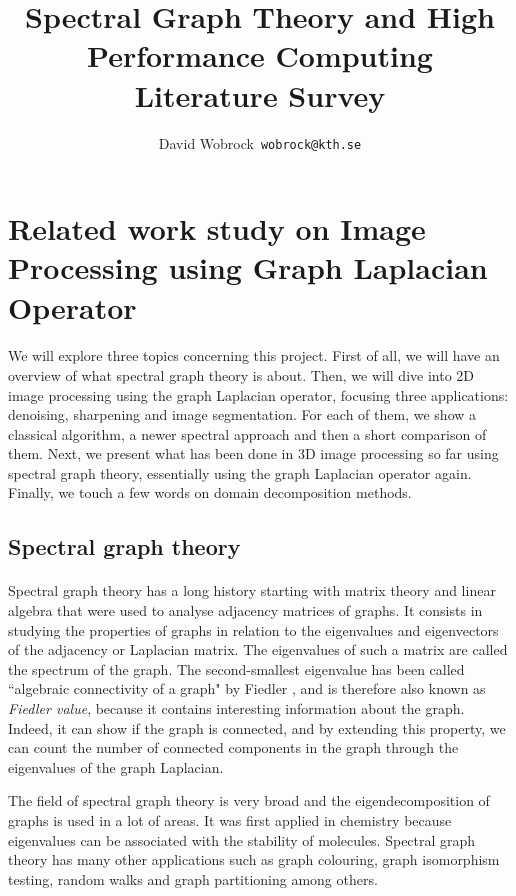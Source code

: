 \documentclass[]{article}
\title{Spectral Graph Theory and High Performance Computing \\ Literature Survey}
\author{David Wobrock\ \texttt{wobrock@kth.se}}
\begin{document}
\maketitle

\section{Related work study on Image Processing using Graph Laplacian Operator}

\paragraph{}
We will explore three topics concerning this project.
First of all, we will have an overview of what spectral graph theory is about.
Then, we will dive into 2D image processing using the graph Laplacian operator, focusing three applications: denoising, sharpening and image segmentation.
For each of them, we show a classical algorithm, a newer spectral approach and then a short comparison of them.
Next, we present what has been done in 3D image processing so far using spectral graph theory, essentially using the graph Laplacian operator again.
Finally, we touch a few words on domain decomposition methods.

\subsection{Spectral graph theory}

\paragraph{}
Spectral graph theory has a long history starting with matrix theory and linear algebra that were used to analyse adjacency matrices of graphs.
It consists in studying the properties of graphs in relation to the eigenvalues and eigenvectors of the adjacency or Laplacian matrix.
The eigenvalues of such a matrix are called the spectrum of the graph.
The second-smallest eigenvalue has been called ``algebraic connectivity of a graph" by Fiedler \cite{fiedler_algebraic_1973}, and is therefore also known as \textit{Fiedler value}, because it contains interesting information about the graph.
Indeed, it can show if the graph is connected, and by extending this property, we can count the number of connected components in the graph through the eigenvalues of the graph Laplacian.

The field of spectral graph theory is very broad and the eigendecomposition of graphs is used in a lot of areas.
It was first applied in chemistry because eigenvalues can be associated with the stability of molecules.
Spectral graph theory has many other applications such as graph colouring, graph isomorphism testing, random walks and graph partitioning among others.
\end{document}
